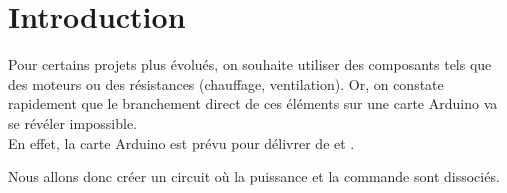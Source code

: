 \chapter{Introduction}

Pour certains projets plus évolués, on souhaite utiliser des composants tels que des moteurs ou des résistances (chauffage, ventilation).
Or, on constate rapidement que le branchement direct de ces éléments sur une carte Arduino va se révéler impossible. \\

En effet, la carte Arduino est prévu pour délivrer de  et .

Nous allons donc créer un circuit où la puissance et la commande sont dissociés.
